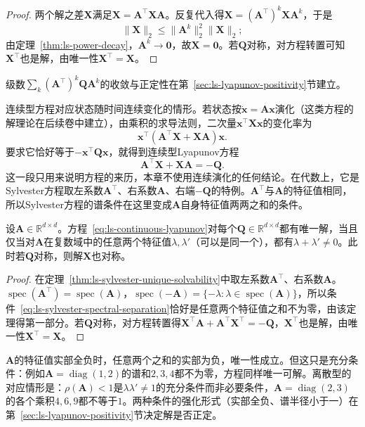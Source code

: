 \begin{proof}
两个解之差$\bm X$满足$\bm X=\bm A^\top\bm X\bm A$。反复代入得$\bm X=(\bm A^\top)^k\bm X\bm A^k$，于是
\[
 \lVert\bm X\rVert_2\leq\lVert\bm A^k\rVert_2^2\lVert\bm X\rVert_2 ;
\]
由定理~\ref{thm:ls-power-decay}，$\bm A^k\to\bm0$，故$\bm X=\bm0$。若$\bm Q$对称，对方程转置可知$\bm X^\top$也是解，由唯一性$\bm X^\top=\bm X$。
\end{proof}

级数$\sum_k(\bm A^\top)^k\bm Q\bm A^k$的收敛与正定性在第~\ref{sec:ls-lyapunov-positivity}节建立。

连续型方程对应状态随时间连续变化的情形。若状态按$\dot{\bm x}=\bm A\bm x$演化（这类方程的解理论在后续卷中建立），由乘积的求导法则，二次量$\bm x^\top\bm X\bm x$的变化率为
\[
 \bm x^\top(\bm A^\top\bm X+\bm X\bm A)\bm x .
\]
要求它恰好等于$-\bm x^\top\bm Q\bm x$，就得到连续型Lyapunov方程
\begin{equation}
 \bm A^\top\bm X+\bm X\bm A=-\bm Q .
 \label{eq:ls-continuous-lyapunov}
\end{equation}
这一段只用来说明方程的来历，本章不使用连续演化的任何结论。在代数上，它是Sylvester方程取左系数$\bm A^\top$、右系数$\bm A$、右端$-\bm Q$的特例。$\bm A^\top$与$\bm A$的特征值相同，所以Sylvester方程的谱条件在这里变成$\bm A$自身特征值两两之和的条件。

\begin{theorem}[连续型Lyapunov方程的唯一可解性]
\label{thm:ls-continuous-lyapunov-unique}
设$\bm A\in\mathbb R^{d\times d}$。方程~\eqref{eq:ls-continuous-lyapunov}对每个$\bm Q\in\mathbb R^{d\times d}$都有唯一解，当且仅当对$\bm A$在复数域中的任意两个特征值$\lambda,\lambda'$（可以是同一个），都有$\lambda+\lambda'\neq0$。此时若$\bm Q$对称，则解$\bm X$也对称。
\end{theorem}

\begin{proof}
在定理~\ref{thm:ls-sylvester-unique-solvability}中取左系数$\bm A^\top$、右系数$\bm A$。$\operatorname{spec}(\bm A^\top)=\operatorname{spec}(\bm A)$，$\operatorname{spec}(-\bm A)=\{-\lambda:\lambda\in\operatorname{spec}(\bm A)\}$，所以条件~\eqref{eq:ls-sylvester-spectral-separation}恰好是任意两个特征值之和不为零，由该定理得第一部分。若$\bm Q$对称，对方程转置得$\bm X^\top\bm A+\bm A^\top\bm X^\top=-\bm Q$，$\bm X^\top$也是解，由唯一性$\bm X^\top=\bm X$。
\end{proof}

$\bm A$的特征值实部全负时，任意两个之和的实部为负，唯一性成立。但这只是充分条件：例如$\bm A=\operatorname{diag}(1,2)$的谱和$2,3,4$都不为零，方程同样唯一可解。离散型的对应情形是：$\rho(\bm A)<1$是$\lambda\lambda'\neq1$的充分条件而非必要条件，$\bm A=\operatorname{diag}(2,3)$的各个乘积$4,6,9$都不等于$1$。两种条件的强化形式（实部全负、谱半径小于一）在第~\ref{sec:ls-lyapunov-positivity}节决定解是否正定。

